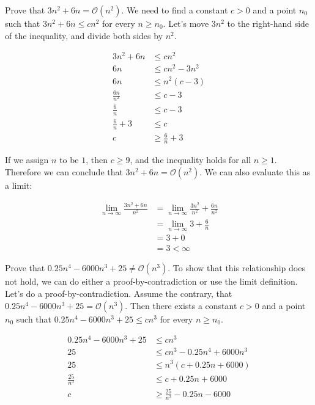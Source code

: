 \noindent{}

\example Prove that $3n^2 + 6n = \mathcal{O}(n^2)$. We need to find a constant $c > 0$ and a point $n_0$ such that $3n^2 + 6n \leq cn^2$ for every $n \geq n_0$. Let's move $3n^2$ to the right-hand side of the inequality, and divide both sides by $n^2$.

\begin{align*}
  3n^2 + 6n &\leq cn^2\\
  6n &\leq cn^2 - 3n^2\\
  6n &\leq n^2(c - 3)\\
  \frac{6n}{n^2} &\leq c - 3\\
  \frac{6}{n} &\leq c - 3\\
  \frac{6}{n} + 3 &\leq c\\
  c &\geq \frac{6}{n} + 3
\end{align*}

If we assign $n$ to be $1$, then $c \geq 9$, and the inequality holds for all $n \geq 1$. Therefore we can conclude that $3n^2 + 6n = \mathcal{O}(n^2)$. We can also evaluate this as a limit:

\begin{align*}
  \lim_{n \to \infty} \frac{3n^2 + 6n}{n^2} &= \lim_{n \to \infty} \frac{3n^2}{n^2} + \frac{6n}{n^2}\\
  &= \lim_{n \to \infty} 3 + \frac{6}{n}\\
  &= 3 + 0\\
  &= 3 < \infty
\end{align*}

\example Prove that $0.25n^4 - 6000n^3 + 25 \neq \mathcal{O}(n^3)$. To show that this relationship does not hold, we can do either a proof-by-contradiction or use the limit definition. Let's do a proof-by-contradiction. Assume the contrary, that $0.25n^4 - 6000n^3 + 25 = \mathcal{O}(n^3)$. Then there exists a constant $c > 0$ and a point $n_0$ such that $0.25n^4 - 6000n^3 + 25 \leq cn^3$ for every $n \geq n_0$.

\begin{align*}
  0.25n^4 - 6000n^3 + 25 &\leq cn^3\\
  25 &\leq cn^3 - 0.25n^4 + 6000n^3\\
  25 &\leq n^3(c + 0.25n + 6000)\\
  \frac{25}{n^3} &\leq c + 0.25n + 6000\\
  c &\geq \frac{25}{n^3} - 0.25n - 6000
\end{align*}

